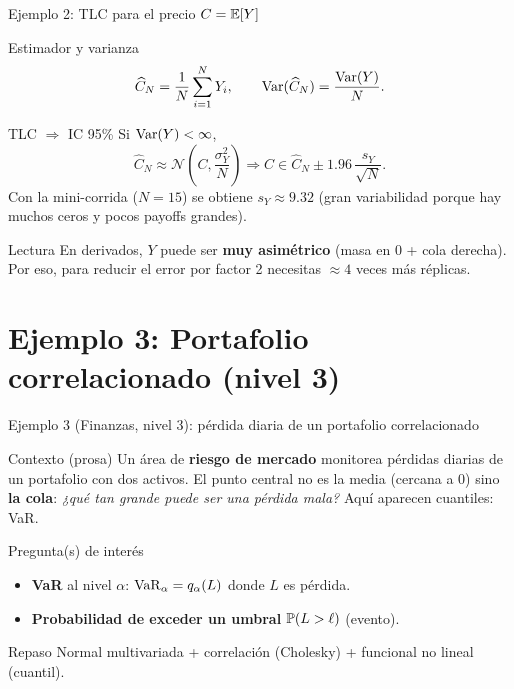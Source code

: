 \documentclass[aspectratio=1610, 9pt]{beamer}
\begin{document}
\begin{frame}{Ejemplo 2: TLC para el precio $C=\mathbb{E}[Y]$}
\small
\begin{block}{Estimador y varianza}
\[
\widehat{C}_N=\frac{1}{N}\sum_{i=1}^N Y_i,\qquad
\operatorname{Var}(\widehat{C}_N)=\frac{\operatorname{Var}(Y)}{N}.
\]
\end{block}

\begin{block}{TLC $\Rightarrow$ IC 95\%}
Si $\operatorname{Var}(Y)<\infty$,
\[
\widehat{C}_N \approx \mathcal{N}\!\left(C,\frac{\sigma_Y^2}{N}\right)
\Rightarrow
C\in \widehat{C}_N \pm 1.96\,\frac{s_Y}{\sqrt{N}}.
\]
Con la mini-corrida ($N=15$) se obtiene $s_Y\approx 9.32$ (gran variabilidad porque hay muchos ceros y pocos payoffs grandes).
\end{block}

\begin{alertblock}{Lectura}
En derivados, $Y$ puede ser \textbf{muy asimétrico} (masa en 0 + cola derecha).
Por eso, para reducir el error por factor 2 necesitas $\approx 4$ veces más réplicas.
\end{alertblock}
\end{frame}

\section*{Ejemplo 3: Portafolio correlacionado (nivel 3)}

\begin{frame}{Ejemplo 3 (Finanzas, nivel 3): pérdida diaria de un portafolio correlacionado}
\small
\begin{block}{Contexto (prosa)}
Un área de \textbf{riesgo de mercado} monitorea pérdidas diarias de un portafolio con dos activos.
El punto central no es la media (cercana a 0) sino \textbf{la cola}: \emph{¿qué tan grande puede ser una pérdida mala?}
Aquí aparecen cuantiles: VaR.
\end{block}

\begin{block}{Pregunta(s) de interés}
\begin{itemize}
\item \textbf{VaR} al nivel $\alpha$: $\mathrm{VaR}_\alpha = q_\alpha(L)$ donde $L$ es pérdida.
\item \textbf{Probabilidad de exceder un umbral} $\mathbb{P}(L>\ell)$ (evento).
\end{itemize}
\end{block}

\begin{alertblock}{Repaso}
Normal multivariada + correlación (Cholesky) + funcional no lineal (cuantil).
\end{alertblock}
\end{frame}
\end{document}
